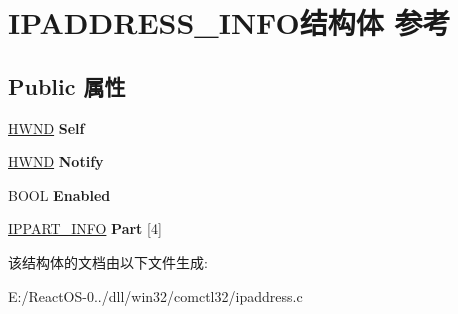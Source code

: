 \hypertarget{struct_i_p_a_d_d_r_e_s_s___i_n_f_o}{}\section{I\+P\+A\+D\+D\+R\+E\+S\+S\+\_\+\+I\+N\+F\+O结构体 参考}
\label{struct_i_p_a_d_d_r_e_s_s___i_n_f_o}
\subsection*{Public 属性}
\begin{DoxyCompactItemize}
\item 
\mbox{\label{struct_i_p_a_d_d_r_e_s_s___i_n_f_o_a06a25ad8eee5929ff9ba090700d8f378}} 
\hyperlink{interfacevoid}{H\+W\+ND} {\bfseries Self}
\item 
\mbox{\label{struct_i_p_a_d_d_r_e_s_s___i_n_f_o_a8125f8de14d69b487c7e2ebcfe83f094}} 
\hyperlink{interfacevoid}{H\+W\+ND} {\bfseries Notify}
\item 
\mbox{\label{struct_i_p_a_d_d_r_e_s_s___i_n_f_o_ac71bd17cd4856fc154994f6a170905cc}} 
B\+O\+OL {\bfseries Enabled}
\item 
\mbox{\label{struct_i_p_a_d_d_r_e_s_s___i_n_f_o_a079a0ad1ba4daca9948954ed9242a0bd}} 
\hyperlink{struct_i_p_p_a_r_t___i_n_f_o}{I\+P\+P\+A\+R\+T\+\_\+\+I\+N\+FO} {\bfseries Part} \mbox{[}4\mbox{]}
\end{DoxyCompactItemize}


该结构体的文档由以下文件生成\+:\begin{DoxyCompactItemize}
\item 
E\+:/\+React\+O\+S-\/0../dll/win32/comctl32/ipaddress.\+c\end{DoxyCompactItemize}
